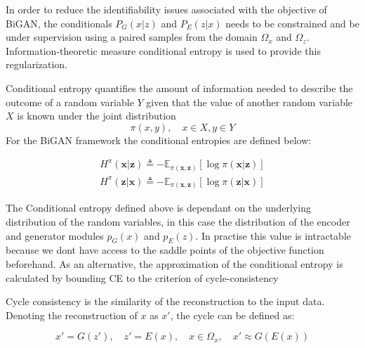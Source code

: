 In order to reduce the identifiability issues associated with the objective of BiGAN, the
conditionals $P_{G}(x|z)$ and $P_{E}(z|x)$ needs to be constrained and be under supervision using a
paired samples from the domain $\Omega_{x}$ and $\Omega_{z}$. Information-theoretic measure
conditional entropy is used to provide this regularization. 

Conditional entropy quantifies the amount of information needed to describe the outcome of a random variable 
$Y$ given that the value of another random variable $X$ is known \cite{Cover:2006:EIT:1146355}  under the joint distribution 
$$
\pi(x ,y ) ,\quad x \in X , y \in Y
$$ 
For the BiGAN framework the conditional entropies are defined below:

\begin{align}
    H^{\pi}(\boldsymbol{x} | \boldsymbol{z}) \triangleq-\mathbb{E}_{\pi(\boldsymbol{x}, \boldsymbol{z})}[\log \pi(\boldsymbol{x} | \boldsymbol{z})] \\[5pt]
    H^{\pi}(\boldsymbol{z} | \boldsymbol{x}) \triangleq-\mathbb{E}_{\pi(\boldsymbol{x}, \boldsymbol{z})}[\log \pi(\boldsymbol{z} | \boldsymbol{x})] 
\end{align}

The Conditional entropy defined above is dependant on the underlying distribution of the random
variables, in this case the distribution of the encoder and generator modules $p_{G}(x)$ and
$p_{E}(z)$. In practise this value is intractable because we dont have access to the saddle points
of the objective function beforehand. As an alternative, the approximation of the conditional
entropy is calculated by bounding CE to the criterion of cycle-consistency \cite{Zhu2017UnpairedIT}

Cycle consistency is the similarity of the reconstruction to the input data. Denoting the
reconstruction of $x$ as $x'$, the cycle can be defined as: 

\begin{equation}
  x' = G(z'), \quad z' = E(x),\quad x \in \Omega_{x},\quad x' \approx G(E(x)) 
\end{equation}

